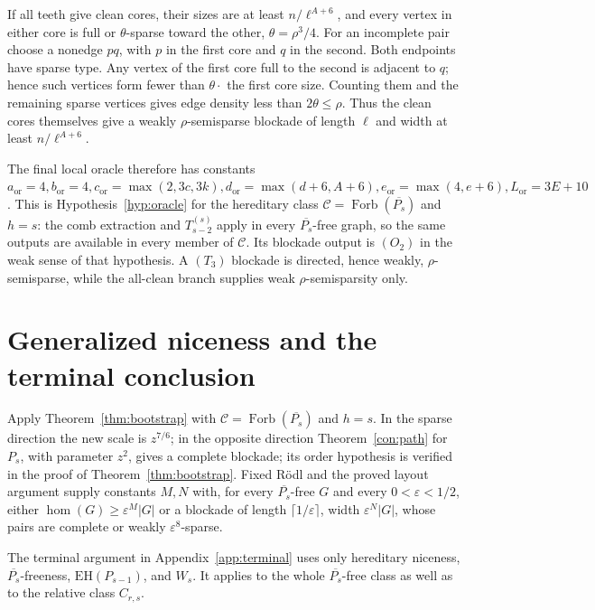 \documentclass[11pt,a4paper]{article}
\theoremstyle{definition}
\theoremstyle{remark}
\numberwithin{equation}{section}
\DeclareMathOperator{\Forb}{Forb}
\newcommand{\EH}{\mathrm{EH}}
\begin{document}
If all teeth give clean cores, their sizes are at least \(n/\ell^{A+6}\), and every vertex in either core is full or \(\theta\)-sparse toward the other, \(\theta=\rho^{3}/4\). For an incomplete pair choose a nonedge \(pq\), with \(p\) in the first core and \(q\) in the second. Both endpoints have sparse type. Any vertex of the first core full to the second is adjacent to \(q\); hence such vertices form fewer than \(\theta \cdot \) the first core size. Counting them and the remaining sparse vertices gives edge density less than \(2\theta\le\allowbreak \rho\). Thus the clean cores themselves give a weakly \(\rho\)-semisparse blockade of length \(\ell\) and width at least \(n/\ell^{A+6}\).

The final local oracle therefore has constants \(a_{\mathrm{or}}=4,\allowbreak  b_{\mathrm{or}}=4,\allowbreak  c_{\mathrm{or}}=\max (2,\allowbreak 3c,\allowbreak 3k),\allowbreak  d_{\mathrm{or}}=\max (d+6,\allowbreak A+6),\allowbreak  e_{\mathrm{or}}=\max (4,\allowbreak e+6),\allowbreak  L_{\mathrm{or}}=3E+10\). This is Hypothesis~\ref{hyp:oracle} for the hereditary class \(\mathcal C=\Forb(\overline{P_s})\) and \(h=s\): the comb extraction and \(T_{s-2}^{(s)}\) apply in every \(\overline{P_s}\)-free graph, so the same outputs are available in every member of \(\mathcal C\). Its blockade output is \((O_{2})\) in the weak sense of that hypothesis. A \((T_{3})\) blockade is directed, hence weakly, \(\rho\)-semisparse, while the all-clean branch supplies weak \(\rho\)-semisparsity only.


\section{Generalized niceness and the terminal conclusion}\label{sec:conclusion}
Apply Theorem~\ref{thm:bootstrap} with \(\mathcal C=\Forb(\overline{P_s})\) and \(h=s\). In the sparse direction the new scale is \(z^{7/6}\); in the opposite direction Theorem~\ref{con:path} for \(P_{s}\), with parameter \(z^{2}\), gives a complete blockade; its order hypothesis is verified in the proof of Theorem~\ref{thm:bootstrap}. Fixed R\"odl and the proved layout argument supply constants \(M,\allowbreak N\) with, for every \(\overline{P_{s}}\)-free \(G\) and every \(0<\varepsilon<1/2\), either \(\hom (G)\ge\allowbreak \varepsilon^{M}|G|\) or a blockade of length \(\lceil 1/\varepsilon\rceil\), width \(\varepsilon^{N}|G|\), whose pairs are complete or weakly \(\varepsilon^{8}\)-sparse.

The terminal argument in Appendix~\ref{app:terminal} uses only hereditary niceness, \(\overline{P_s}\)-freeness, \(\EH(P_{s-1})\), and \(W_s\). It applies to the whole \(\overline{P_s}\)-free class as well as to the relative class \(C_{r,s}\).
\end{document}
